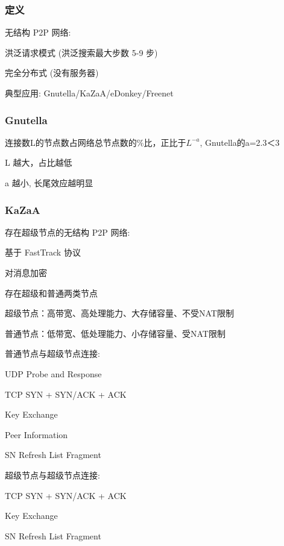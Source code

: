 \documentclass[UTF8,cs4size]{ctexart}
\begin{document}
\subsubsection{定义}
无结构 P2P 网络:
\begin{compactitem}
  \item 洪泛请求模式 (洪泛搜索最大步数 5-9 步)
  \item 完全分布式 (没有服务器)
  \item 典型应用: Gnutella/KaZaA/eDonkey/Freenet
\end{compactitem}
\subsubsection{Gnutella}
连接数L的节点数占网络总节点数的\%比，正比于$L^{-a}$, Gnutella的a=2.3＜3
\begin{compactitem}
  \item L 越大，占比越低
  \item a 越小, 长尾效应越明显
\end{compactitem}
\subsubsection{KaZaA}
存在超级节点的无结构 P2P 网络:
\begin{compactitem}
  \item 基于 FastTrack 协议
  \item 对消息加密
  \item 存在超级和普通两类节点
  \item 超级节点：高带宽、高处理能力、大存储容量、不受NAT限制
  \item 普通节点：低带宽、低处理能力、小存储容量、受NAT限制
\end{compactitem}

普通节点与超级节点连接:
\begin{compactitem}
  \item UDP Probe and Response
  \item TCP SYN + SYN/ACK + ACK
  \item Key Exchange
  \item Peer Information
  \item SN Refresh List Fragment
\end{compactitem}

超级节点与超级节点连接:
\begin{compactitem}
  \item TCP SYN + SYN/ACK + ACK
  \item Key Exchange
  \item SN Refresh List Fragment
\end{compactitem}
\end{document}
